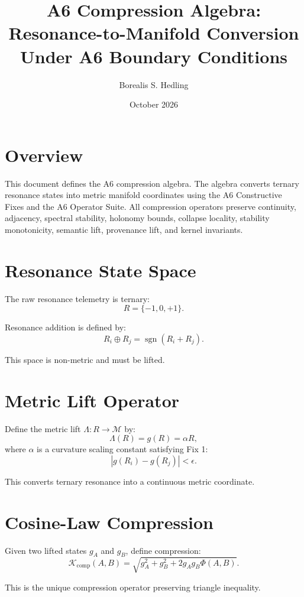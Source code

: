 \documentclass[11pt]{article}
\title{A6 Compression Algebra: Resonance-to-Manifold Conversion Under A6 Boundary Conditions}
\author{Borealis S. Hedling}
\date{October 2026}
\begin{document}
\maketitle

\section*{Overview}

This document defines the A6 compression algebra. The algebra converts
ternary resonance states into metric manifold coordinates using the A6
Constructive Fixes and the A6 Operator Suite. All compression operators
preserve continuity, adjacency, spectral stability, holonomy bounds,
collapse locality, stability monotonicity, semantic lift, provenance lift,
and kernel invariants.

\section{Resonance State Space}

The raw resonance telemetry is ternary:
\[
R = \{-1, 0, +1\}.
\]

Resonance addition is defined by:
\[
R_i \oplus R_j = \operatorname{sgn}(R_i + R_j).
\]

This space is non-metric and must be lifted.

\section{Metric Lift Operator}

Define the metric lift $\Lambda : R \to \mathcal{M}$ by:
\[
\Lambda(R) = g(R) = \alpha R,
\]
where $\alpha$ is a curvature scaling constant satisfying Fix 1:
\[
|g(R_i) - g(R_j)| < \epsilon.
\]

This converts ternary resonance into a continuous metric coordinate.

\section{Cosine-Law Compression}

Given two lifted states $g_A$ and $g_B$, define compression:
\[
\mathcal{K}_{\mathrm{comp}}(A,B)
  = \sqrt{g_A^2 + g_B^2 + 2 g_A g_B \Phi(A,B)}.
\]

This is the unique compression operator preserving triangle inequality.
\end{document}
